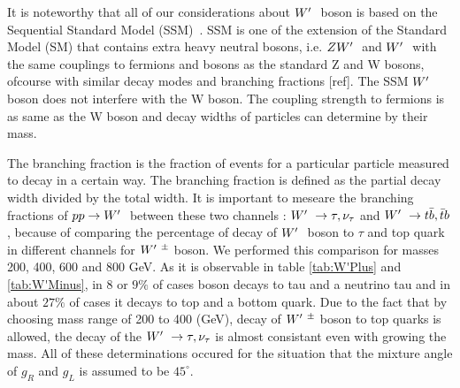 It is noteworthy that all of our considerations about $ W^\prime~ $ boson is based on the Sequential Standard Model (SSM)~\cite{Khachatryan:2014tva}. SSM is one of the extension of the Standard Model (SM) that contains extra heavy neutral bosons, i.e. $ ZW^\prime~ $ and $ W^\prime~ $ with the same couplings to fermions and bosons as the standard Z and W bosons, ofcourse with similar decay modes and branching fractions [ref]. The SSM $ W^\prime~ $ boson does not interfere with the W boson. The coupling strength to fermions is as same as the W boson and decay widths of particles can determine by their mass. 

The branching fraction is the fraction of events for a particular particle measured to decay in a certain way. The branching fraction is defined as the partial decay width divided by the total width. It is important to meseare the branching fractions of $ pp\rightarrow W^\prime~$ between these two channels : $ W^\prime~\rightarrow \tau,\nu_\tau $ and $ W^\prime~\rightarrow  t \bar{b},\bar{t}b $, because of comparing the percentage of decay of $ W^\prime~ $ boson to $ \tau $ and top quark in different channels for $ W^\prime~^\pm $ boson. We performed this comparison for masses 200, 400, 600 and 800 GeV. As it is observable in table \ref{tab:W'Plus} and \ref{tab:W'Minus}, in 8 or $9\%$ of cases \wprime boson decays to tau and a neutrino tau and in about $27\%$ of cases it decays to top and a bottom quark. Due to the fact that by choosing mass range of 200 to 400 (GeV), decay of $ W^\prime~^\pm $ boson to top quarks is allowed, the decay of the $ W^\prime~\rightarrow \tau,\nu_\tau $ is almost consistant even with growing the mass. All of these determinations occured for the situation that the mixture angle of $ g_R$ and  $g_L$ is assumed to be $45^\circ $. 
 



